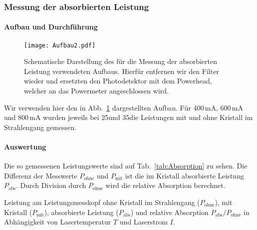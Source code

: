 \subsubsection{Messung der absorbierten Leistung}

\paragraph{Aufbau und Durchführung}

\begin{figure}[H]
\begin{center}
  \texttt{[image: Aufbau2.pdf]}
  \caption{Schematische Darstellung des für die Messung der absorbierten Leistung verwendeten
  Aufbaus. Hierfür entfernen wir den Filter wieder und ersetzten den Photodetektor mit dem
  Powerhead, welcher an das Powermeter angeschlossen wird.}
  \label{img:aufbau2}
\end{center}
\end{figure}

Wir verwenden hier den in Abb.~\ref{img:aufbau2} dargestellten Aufbau. Für 400\,mA, 600\,mA und
800\,mA wurden jeweils bei 25\grad und 35\grad die Leistungen mit und ohne Kristall im Strahlengang
gemessen.



\paragraph{Auswertung}
Die so gemessenen Leistungswerte sind auf Tab.~\ref{tab:Absorption} zu sehen.
Die Differenz der Messwerte $P_\text{ohne}$ und $P_\text{mit}$ ist die im Kristall
absorbierte Leistung $P_\text{abs}$.
Durch Division durch $P_\text{ohne}$ wird die relative Absorption berechnet.

\begin{table}[htb]
\caption{Leistung am Leistungsmesskopf ohne Kristall im Strahlengang ($P_\text{ohne}$),
mit Kristall ($P_\text{mit}$), absorbierte Leistung ($P_\text{abs}$) und relative Absorption
$P_\text{abs}/P_\text{ohne}$ in Abhängigkeit von Lasertemperatur $T$ und Laserstrom $I$.}

\label{tab:Absorption}
\end{table}
